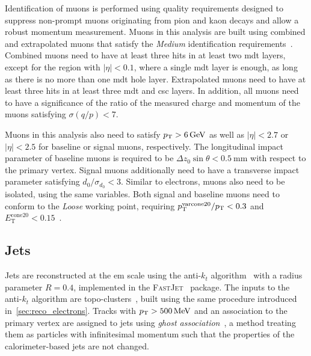 Identification of muons is performed using quality requirements designed to suppress non-prompt muons originating from pion and kaon decays and allow a robust momentum measurement. Muons in this analysis are built using combined and extrapolated muons that satisfy the \textit{Medium} identification requirements~\cite{PERF-2015-10}. Combined muons need to have at least three hits in at least two \gls{mdt} layers, except for the region with $\vert\eta\vert < 0.1$, where a single \gls{mdt} layer is enough, as long as there is no more than one \gls{mdt} hole layer. Extrapolated muons need to have at least three hits in at least three \gls{mdt} and \gls{csc} layers. In addition, all muons need to have a significance of the ratio of the measured charge and momentum of the muons satisfying $\sigma(q/p) < 7$.

Muons in this analysis also need to satisfy $\pt > \SI{6}{\GeV}$ as well as $\vert\eta\vert < 2.7$ or $\vert\eta\vert < 2.5$ for baseline or signal muons, respectively. The longitudinal impact parameter of baseline muons is required to be $\Delta z_0\sin\theta < \SI{0.5}{\milli\meter}$ with respect to the primary vertex. Signal muons additionally need to have a transverse impact parameter satisfying $d_0/\sigma_{d_0} < 3$. Similar to electrons, muons also need to be isolated, using the same variables. Both signal and baseline muons need to conform to the \textit{Loose} working point, requiring $p_{\mathrm{T}}^{\mathrm{varcone20}}/p_{\textrm{T}} < 0.3$ and $E_{\mathrm{T}}^{\mathrm{cone20}} < 0.15$~\cite{Aad:2020gmm}.


\subsection{Jets}

Jets are reconstructed at the \gls{em} scale using the anti-$k_t$ algorithm~\cite{Cacciari:2008gp} with a radius parameter $R=0.4$, implemented in the \textsc{FastJet}~\cite{Fastjet,Cacciari:2006sm} package. The inputs to the anti-$k_t$ algorithm are topo-clusters~\cite{Aad:2020flx}, built using the same procedure introduced in~\cref{sec:reco_electrons}. Tracks with $\pt > \SI{500}{\MeV}$ and an association to the primary vertex are assigned to jets using \textit{ghost association}~\cite{Cacciari:2007fd}, a method treating them as particles with infinitesimal momentum such that the properties of the calorimeter-based jets are not changed. 


